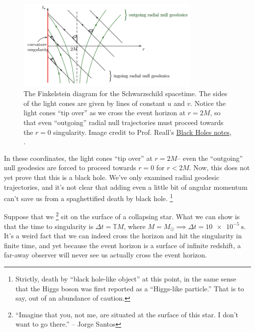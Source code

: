 \begin{figure}
    \centering
    \includegraphics[width=0.8\textwidth]{2019/01/20190124_reall_finkelsteindiagram.png}
    \caption{
    The Finkelstein diagram for the Schwarzschild spacetime. The sides of the light cones are given by lines of constant $u$ and $v$. Notice the light cones ``tip over'' as we cross the event horizon at $r=2M$, so that even ``outgoing'' radial null trajectories must proceed towards the $r=0$ singularity.
    \newline
    Image credit to Prof. Reall's  \href{http://www.damtp.cam.ac.uk/user/hsr1000/black_holes_lectures_2016.pdf}{Black Holes notes}, .
    }
    \label{fig:reall_finkelsteindiagram}
\end{figure}

In these coordinates, the light cones ``tip over'' at $r=2M$-- even the ``outgoing'' null geodesics are forced to proceed towards $r=0$ for $r<2M$. Now, this does not yet prove that this is a black hole. We've only examined radial geodesic trajectories, and it's not clear that adding even a little bit of angular momentum can't save us from a spaghettified death by black hole.%
    \footnote{Strictly, death by ``black hole-like object'' at this point, in the same sense that the Higgs boson was first reported as a ``Higgs-like particle.'' That is to say, out of an abundance of caution.}

Suppose that we%
    \footnote{``Imagine that you, not me, are situated at the surface of this star. I don't want to go there.'' -- Jorge Santos
    }
sit on the surface of a collapsing star. What we can show is that the time to singularity is $\Delta t = \mathbb{T} M$, where $M=M_\odot \implies \Delta t= \SI{10e-5}{\second}.$ It's a weird fact that we can indeed cross the horizon and hit the singularity in finite time, and yet because the event horizon is a surface of infinite redshift, a far-away observer will never see us actually cross the event horizon.

